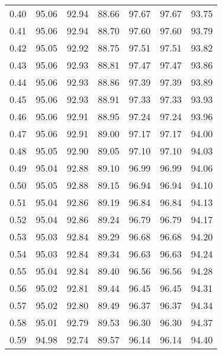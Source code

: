 \begin{tabular}{|c|c|c|c|c|c|c|}
      0.40 &     95.06 &     92.94 &      88.66 &   97.67 &      97.67 &         93.75 \\
      0.41 &     95.06 &     92.94 &      88.70 &   97.60 &      97.60 &         93.79 \\
      0.42 &     95.05 &     92.92 &      88.75 &   97.51 &      97.51 &         93.82 \\
      0.43 &     95.06 &     92.93 &      88.81 &   97.47 &      97.47 &         93.86 \\
      0.44 &     95.06 &     92.93 &      88.86 &   97.39 &      97.39 &         93.89 \\
      0.45 &     95.06 &     92.93 &      88.91 &   97.33 &      97.33 &         93.93 \\
      0.46 &     95.06 &     92.91 &      88.95 &   97.24 &      97.24 &         93.96 \\
      0.47 &     95.06 &     92.91 &      89.00 &   97.17 &      97.17 &         94.00 \\
      0.48 &     95.05 &     92.90 &      89.05 &   97.10 &      97.10 &         94.03 \\
      0.49 &     95.04 &     92.88 &      89.10 &   96.99 &      96.99 &         94.06 \\
      0.50 &     95.05 &     92.88 &      89.15 &   96.94 &      96.94 &         94.10 \\
      0.51 &     95.04 &     92.86 &      89.19 &   96.84 &      96.84 &         94.13 \\
      0.52 &     95.04 &     92.86 &      89.24 &   96.79 &      96.79 &         94.17 \\
      0.53 &     95.03 &     92.84 &      89.29 &   96.68 &      96.68 &         94.20 \\
      0.54 &     95.03 &     92.84 &      89.34 &   96.63 &      96.63 &         94.24 \\
      0.55 &     95.04 &     92.84 &      89.40 &   96.56 &      96.56 &         94.28 \\
      0.56 &     95.02 &     92.81 &      89.44 &   96.45 &      96.45 &         94.31 \\
      0.57 &     95.02 &     92.80 &      89.49 &   96.37 &      96.37 &         94.34 \\
      0.58 &     95.01 &     92.79 &      89.53 &   96.30 &      96.30 &         94.37 \\
      0.59 &     94.98 &     92.74 &      89.57 &   96.14 &      96.14 &         94.40 \\

\end{tabular}

